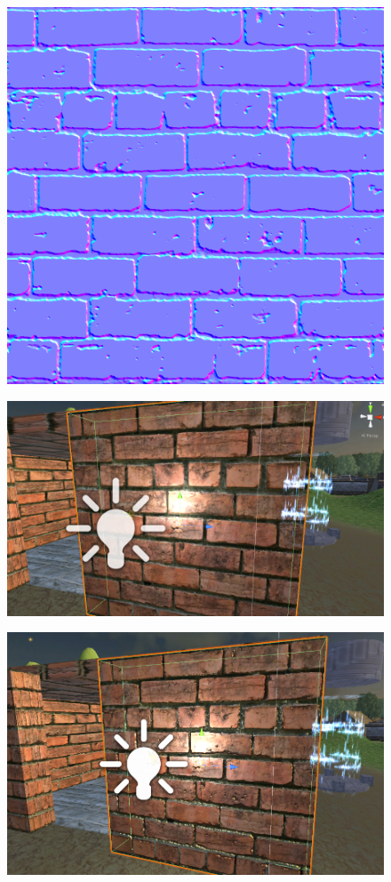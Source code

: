 \documentclass[a4paper, 13pt]{extarticle}
\begin{document}
{ \begin{figure}[h]
 	\centering
 	\begin{minipage}{.3\textwidth}
 		\centering
 		\includegraphics[width=0.5\linewidth]{intructions/Brick001_n.png}
 		\centering
 		\label{fig:test19}
 	\end{minipage}
 	\begin{minipage}{.33\textwidth}
 		\centering
 		\includegraphics[width=1\linewidth]{intructions/without_normalmap.png}
 		\centering
 		\label{fig:test20}
 	\end{minipage}
 	\begin{minipage}{.33\textwidth}
 		\centering
 		\includegraphics[width=1\linewidth]{intructions/with_normalmap.png}
 		\label{fig:test21}
 	\end{minipage}
 \end{figure} 

}
\end{document}
